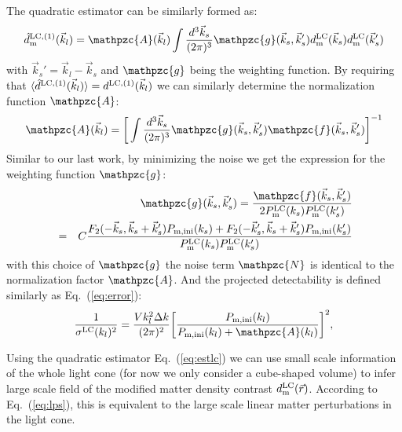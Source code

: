 \documentclass[prd,amsmath,amssymb,floatfix,superscriptaddress,nofootinbib,twocolumn]{revtex4-1}
\def\be{\begin{equation}}
\def\ee{\end{equation}}
\newcommand{\LC}{\rm LC}
\newcommand{\vrr}{\vec{r}}
\newcommand{\vs}{\nonumber\\}
\newcommand{\vk}{\vec{k}}
\newcommand{\ec}[1]{Eq.~(\ref{eq:#1})}
\newcommand{\eql}[1]{\label{eq:#1}}
\newcommand{\rf}[1]{\ref{fig:#1}}
\newcommand{\sfig}[2]{
\texttt{[image: ../plots/\#1]}
        }
\newcommand{\Sfig}[2]{
   \begin{figure}[thbp]
   \begin{center}
    \sfig{../plots/#1.pdf}{\columnwidth}
    \caption{{\small #2}}
    \label{fig:#1}
     \end{center}
   \end{figure}
}
\begin{document}
The quadratic estimator can be similarly formed as:
\be
\hat{d}^{\rm LC,(1)}_{\rm m}(\vk_l)=\mathpzc{A}(\vk_l)\int \frac{d^{3}\vk_s}{(2\pi)^3} \mathpzc{g}(\vk_s,\vk_s')d^{\LC}_{\rm m}(\vk_s)d^{\LC}_{\rm m}(\vk_s') \eql{estlc}
\ee 
with $\vk_s' = \vk_l-\vk_s$ and $\mathpzc{g}$ being the weighting function. By requiring that $\langle \hat{d}^{\rm LC,(1)}(\vec{k}_l) \rangle={d}^{\rm LC,(1)}(\vec{k}_l)$ we can similarly determine the normalization function $\mathpzc{A}$:
\begin{eqnarray}
\mathpzc{A}(\vec{k}_l)=\bigg[\int \frac{d^3 \vec{k}_s}{(2\pi)^3} \mathpzc{g}(\vec{k}_s,\vec{k}_s')\mathpzc{f}(\vec{k}_s,\vec{k}_s')  \bigg]^{-1} \eql{a}
\end{eqnarray}
Similar to our last work, by minimizing the noise we get the expression for the weighting function $\mathpzc{g}$:
\begin{eqnarray}
&&\mathpzc{g}(\vec{k}_{s},\vec{k}_{s}')
=\frac{\mathpzc{f}(\vec{k}_{s},\vec{k}_{s}')}{2P^{\rm LC}_{\rm m}(k_{s})P^{\rm LC}_{\rm m}(k_{s}')}\vs
&=&C\frac{F_2(-\vec{k}_s,\vec{k}_s+\vec{k}_s')P_{\rm m,ini}(k_s)+F_2(-\vec{k}_s',\vec{k}_s+\vec{k}_s')P_{\rm m,ini}(k_s')}{P^{\rm LC}_{\rm m}(k_{s})P^{\rm LC}_{\rm m}(k_{s}')}\vs 
\end{eqnarray} 
with this choice of $\mathpzc{g}$ the noise term $\mathpzc{N}$ is identical to the normalization factor $\mathpzc{A}$. And the projected detectability is defined similarly as \ec{error}:
\be
\frac{1}{\sigma^{\rm LC}(k_l)^2}=\frac{V k_l^2 \Delta k }{(2\pi)^2}\bigg[\frac{P_{\rm m,ini}(k_l)}{P_{\rm m,ini}(k_l)+\mathpzc{A}(k_l) }\bigg]^2 \eql{error1},
\ee

Using the quadratic estimator \ec{estlc} we can use small scale information of the whole light cone (for now we only consider a cube-shaped volume) to infer large scale field of the modified matter density contrast $d_{\rm m}^{\LC}(\vrr)$. According to \ec{lps}, this is equivalent to the large scale linear matter perturbations in the light cone.
\end{document}

